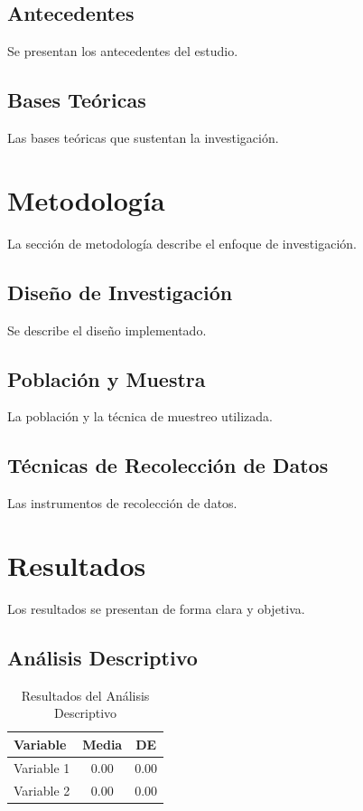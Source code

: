 \documentclass[conference, a4paper]{IEEEtran}
\begin{document}
\subsection{Antecedentes}
Se presentan los antecedentes del estudio.

\subsection{Bases Teóricas}
Las bases teóricas que sustentan la investigación.

\section{Metodología}
\label{sec:metodologia}
La sección de metodología describe el enfoque de investigación.

\subsection{Diseño de Investigación}
Se describe el diseño implementado.

\subsection{Población y Muestra}
La población y la técnica de muestreo utilizada.

\subsection{Técnicas de Recolección de Datos}
Las instrumentos de recolección de datos.

\section{Resultados}
\label{sec:resultados}
Los resultados se presentan de forma clara y objetiva.

\subsection{Análisis Descriptivo}
\begin{table}[htbp]
\centering
\caption{Resultados del Análisis Descriptivo}
\label{tab:resultados}
\begin{tabular}{lcc}
\toprule
Variable & Media & DE \\
\midrule
Variable 1 & 0.00 & 0.00 \\
Variable 2 & 0.00 & 0.00 \\
\bottomrule
\end{tabular}
\end{table}
\end{document}
